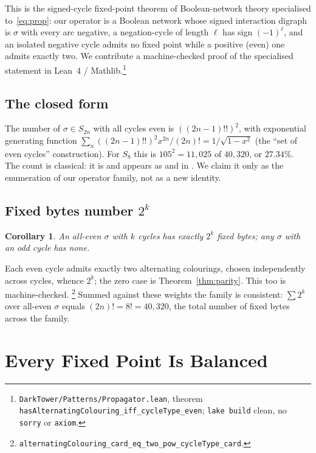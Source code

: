 \documentclass[man,12pt,floatsintext,donotrepeattitle]{apa7}
\newcommand{\sig}{\sigma}
\newtheorem{corollary}{Corollary}
\begin{document}
This is the signed-cycle fixed-point theorem of Boolean-network theory
\parencite{aracena2008maximum} specialised to~\eqref{eq:prop}: our operator
is a Boolean network whose signed interaction digraph is $\sig$ with every
arc negative, a negation-cycle of length $\ell$ has sign $(-1)^\ell$, and
an isolated negative cycle admits no fixed point while a positive (even)
one admits exactly two. We contribute a machine-checked proof of the
specialised statement in Lean~4 / Mathlib.\footnote{%
\texttt{DarkTower/Patterns/Propagator.lean}, theorem
\texttt{hasAlternatingColouring\_iff\_cycleType\_even}; \texttt{lake build}
clean, no \texttt{sorry} or \texttt{axiom}.}

\subsection{The closed form}

The number of $\sig \in S_{2n}$ with all cycles even is $((2n-1)!!)^2$, with
exponential generating function $\sum_n ((2n-1)!!)^2 x^{2n}/(2n)! =
1/\sqrt{1-x^2}$ (the ``set of even cycles'' construction).
For $S_8$ this is $105^2 = 11{,}025$ of $40{,}320$, or $27.34\%$. The count
is classical: it is \textcite{oeis_a001818} and appears as
\textcite[Problem~5.34(c)]{stanley1999enumerative} and in
\textcite{riordan1968combinatorial}. We claim it only as the enumeration of
our operator family, not as a new identity.

\subsection{Fixed bytes number \texorpdfstring{$2^k$}{2 to the k}}

\begin{corollary}\label{cor:count}
An all-even $\sig$ with $k$ cycles has exactly $2^k$ fixed bytes; any $\sig$ with
an odd cycle has none.
\end{corollary}
Each even cycle admits exactly two alternating colourings, chosen independently
across cycles, whence $2^k$; the zero case is Theorem~\ref{thm:parity}. This too
is machine-checked.%
\footnote{\texttt{alternatingColouring\_card\_eq\_two\_pow\_cycleType\_card}.}
Summed against these weights the family is consistent:
$\sum 2^{k}$ over all-even $\sig$ equals $(2n)! = 8! = 40{,}320$, the total
number of fixed bytes across the family.

\section{Every Fixed Point Is Balanced}
\label{sec:lambda}
\end{document}
